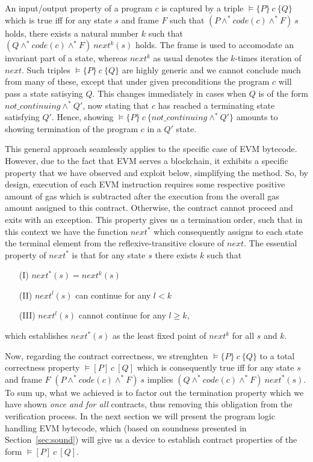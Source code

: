 \documentclass[sigplan,10pt,review]{acmart}\settopmatter{printfolios=true,printccs=false,printacmref=false}
\newcommand{\sconj}{\wedge^*}
\newcommand{\pvalid}[3]{\models\{#1\}\:#2\:\{#3\}}
\newcommand{\tvalid}[3]{\models [#1]\:#2\:[#3]}
\newcommand{\next}{\mathit{next}}
\newcommand{\code}[1]{\mathit{code}(#1)}
\newcommand{\ncont}{\mathit{not\_continuing}}
\begin{document}
An input/output property of a program $c$ is captured by a triple
$\pvalid{P}{c}{Q}$ which is true iff for any state $s$ and frame $F$ such that
$(P \sconj \code{c} \sconj F)\: s$ holds, there exists a natural number $k$ such that 
$(Q \sconj \code{c} \sconj F)\: \next^k(s)$ holds. The frame is used to accomodate
an invariant part of a state, whereas $\next^k$ as usual denotes the $k$-times iteration of $\next$.
Such triples $\pvalid{P}{c}{Q}$ are highly generic and we cannot conclude much from many of these, except that
under given preconditions the program $c$ will pass a state satisying $Q$. This changes immediately in cases when $Q$ is of
the form $\ncont \sconj Q'$, now stating that $c$ has reached a terminating state satisfying $Q'$.
Hence, showing $\pvalid{P}{c}{\ncont \sconj Q'}$ amounts to showing termination of the program $c$ in
a $Q'$ state.

This general approach seamlessly applies to the specific case of EVM bytecode. However,
due to the fact that EVM serves a blockchain, it exhibits a specific property that we have observed and exploit below, simplifying the method. 
So, by design, execution of each EVM instruction requires some respective positive amount of gas which
is subtracted after the execution from the overall gas amount assigned to this contract. 
Otherwise, the contract cannot proceed and exits with an exception.  
This property gives us a termination order, such that in this context we have the function $\next^*$ which 
consequently assigns to each state the terminal element from the reflexive-transitive closure of $\next$. 
The essential property of $\next^*$ is that for any state $s$ there exists $k$ such that
\begin{itemize}
\item[(I)] $\next^*(s) = \next^k(s)$
\item[(II)] $\next^l(s)$ can continue for any $l < k$
\item[(III)] $\next^l(s)$ cannot continue for any $l \ge k$,
\end{itemize}
which establishes $\next^*(s)$ as the least fixed point of $\next^k$ for all $s$ and $k$.

Now, regarding the contract correctness, we strenghten $\pvalid{P}{c}{Q}$ to 
a total correctness property $\tvalid{P}{c}{Q}$ which is consequently true iff
for any state $s$ and frame $F$ 
$(P \sconj \code{c} \sconj F)\: s$ implies $(Q \sconj \code{c} \sconj F)\: \next^*(s)$. 
To sum up, what we achieved is to factor out the termination property which we have 
shown \emph{once and for all} contracts, thus removing this obligation from the verification
process. In the next section we will present the program logic handling EVM bytecode, 
which (based on soundness presented in Section~\ref{sec:sound}) will give us 
a device to establish contract properties of the form $\tvalid{P}{c}{Q}$.   
%       
\end{document}
